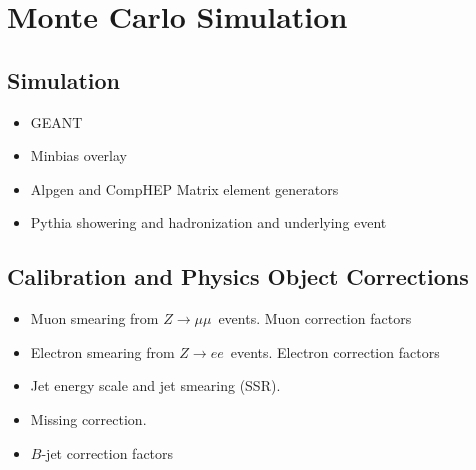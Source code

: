 \chapter{Monte Carlo Simulation}
\section{Simulation}
\begin{itemize}
\item GEANT
\item Minbias overlay
\item Alpgen and CompHEP Matrix element generators
\item Pythia showering and hadronization and underlying event
\end{itemize}

\section{Calibration and Physics Object Corrections}
\begin{itemize}
\item Muon smearing from $Z\rightarrow\mu\mu$~events. Muon correction factors
\item Electron smearing from $Z\rightarrow e e$~events. Electron correction factors
\item Jet energy scale and jet smearing (SSR).
\item Missing correction.
\item $B$-jet correction factors
\end{itemize}
 